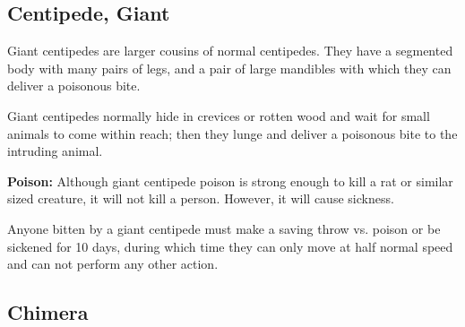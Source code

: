 \begin{multicols*}{2}
\subsection{Centipede, Giant}

Giant centipedes are larger cousins of normal centipedes. They have a segmented body with many pairs of legs, and a pair of large mandibles with which they can deliver a poisonous bite.

Giant centipedes normally hide in crevices or rotten wood and wait for small animals to come within reach; then they lunge and deliver a poisonous bite to the intruding animal.

\textbf{Poison:} Although giant centipede poison is strong enough to kill a rat or similar sized creature, it will not kill a person. However, it will cause sickness.

Anyone bitten by a giant centipede must make a saving throw vs. poison or be sickened for 10 days, during which time they can only move at half normal speed and can not perform any other action.

\subsection{Chimera}
\end{multicols*}
